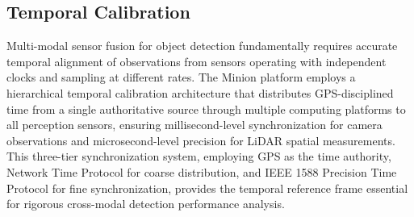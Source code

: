 \documentclass{erauthesis}
\begin{document}



\subsection{Temporal Calibration}\label{time_sync}

Multi-modal sensor fusion for object detection fundamentally requires accurate temporal alignment of observations from sensors operating with independent clocks and sampling at different rates.
The Minion platform employs a hierarchical temporal calibration architecture that distributes GPS-disciplined time from a single authoritative source through multiple computing platforms to all perception sensors, ensuring millisecond-level synchronization for camera observations and microsecond-level precision for LiDAR spatial measurements.
This three-tier synchronization system, employing GPS as the time authority, Network Time Protocol for coarse distribution, and IEEE 1588 Precision Time Protocol for fine synchronization, provides the temporal reference frame essential for rigorous cross-modal detection performance analysis.
\end{document}
